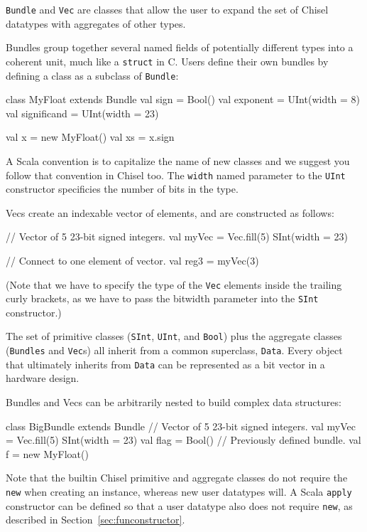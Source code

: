 \documentclass[twocolumn,10pt]{article}
\def\code#1{{\tt #1}}
\begin{document}
\code{Bundle} and \code{Vec} are classes that allow the user to expand
the set of Chisel datatypes with aggregates of other types.

Bundles group together several named fields of potentially different
types into a coherent unit, much like a \code{struct} in C. Users
define their own bundles by defining a class as a subclass of
\code{Bundle}:
\begin{scala}
class MyFloat extends Bundle {
  val sign        = Bool()
  val exponent    = UInt(width = 8)
  val significand = UInt(width = 23)
}

val x  = new MyFloat()
val xs = x.sign
\end{scala}

\noindent
A Scala convention is to capitalize the name of new classes and we
suggest you follow that convention in Chisel too.  The \code{width}
named parameter to the \code{UInt} constructor specificies the number
of bits in the type.

Vecs create an indexable vector of elements, and are constructed as
follows:
\begin{scala}
// Vector of 5 23-bit signed integers.
val myVec = Vec.fill(5){ SInt(width = 23) } 

// Connect to one element of vector. 
val reg3  = myVec(3) 
\end{scala}

\noindent
(Note that we have to specify the type of the \code{Vec} elements
inside the trailing curly brackets, as we have to pass the bitwidth
parameter into the \code{SInt} constructor.)

The set of primitive classes
(\code{SInt}, \code{UInt}, and \code{Bool}) plus the aggregate
classes (\code{Bundles} and \code{Vec}s) all inherit from a common
superclass, \code{Data}.  Every object that ultimately inherits from
\code{Data} can be represented as a bit vector in a hardware design.

Bundles and Vecs can be arbitrarily nested to build complex data
structures:
\begin{scala}
class BigBundle extends Bundle {
 // Vector of 5 23-bit signed integers.
 val myVec = Vec.fill(5) { SInt(width = 23) } 
 val flag  = Bool()
 // Previously defined bundle.
 val f     = new MyFloat()              
}
\end{scala}

\noindent
Note that the builtin Chisel primitive and aggregate classes do not
require the \code{new} when creating an instance, whereas new user
datatypes will.  A Scala \code{apply} constructor can be defined so
that a user datatype also does not require \code{new}, as described in
Section~\ref{sec:funconstructor}.
\end{document}
